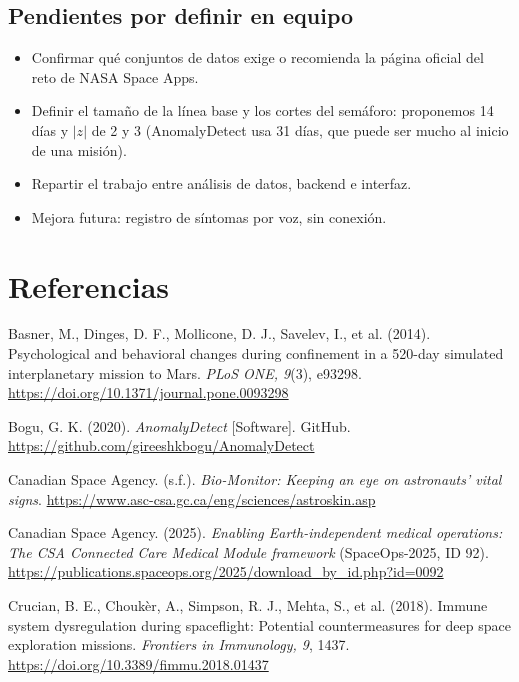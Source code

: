 \documentclass[11pt,a4paper]{article}
\begin{document}
\subsection{Pendientes por definir en equipo}
\begin{itemize}
  \item Confirmar qué conjuntos de datos exige o recomienda la página oficial del reto de NASA Space Apps.
  \item Definir el tamaño de la línea base y los cortes del semáforo: proponemos 14 días y $|z|$ de 2 y 3 (AnomalyDetect usa 31 días, que puede ser mucho al inicio de una misión).
  \item Repartir el trabajo entre análisis de datos, backend e interfaz.
  \item Mejora futura: registro de síntomas por voz, sin conexión.
\end{itemize}

\clearpage
\section*{Referencias}
\begingroup
\small
\setlength{\parindent}{-1.2em}\setlength{\leftskip}{1.2em}\setlength{\parskip}{0.3em}
\raggedright

Basner, M., Dinges, D. F., Mollicone, D. J., Savelev, I., et al. (2014). Psychological and behavioral changes during confinement in a 520-day simulated interplanetary mission to Mars. \emph{PLoS ONE, 9}(3), e93298. \url{https://doi.org/10.1371/journal.pone.0093298}

Bogu, G. K. (2020). \emph{AnomalyDetect} [Software]. GitHub. \url{https://github.com/gireeshkbogu/AnomalyDetect}

Canadian Space Agency. (s.f.). \emph{Bio-Monitor: Keeping an eye on astronauts' vital signs}. \url{https://www.asc-csa.gc.ca/eng/sciences/astroskin.asp}

Canadian Space Agency. (2025). \emph{Enabling Earth-independent medical operations: The CSA Connected Care Medical Module framework} (SpaceOps-2025, ID 92). \url{https://publications.spaceops.org/2025/download_by_id.php?id=0092}

Crucian, B. E., Choukèr, A., Simpson, R. J., Mehta, S., et al. (2018). Immune system dysregulation during spaceflight: Potential countermeasures for deep space exploration missions. \emph{Frontiers in Immunology, 9}, 1437. \url{https://doi.org/10.3389/fimmu.2018.01437}
\end{document}
